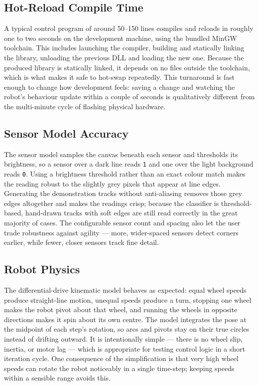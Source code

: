 \subsection{Hot-Reload Compile Time}

A typical control program of around 50--150 lines compiles and reloads in roughly one to two seconds on the development machine, using the bundled MinGW toolchain. This includes launching the compiler, building and statically linking the library, unloading the previous DLL and loading the new one. Because the produced library is statically linked, it depends on no files outside the toolchain, which is what makes it safe to hot-swap repeatedly. This turnaround is fast enough to change how development feels: saving a change and watching the robot's behaviour update within a couple of seconds is qualitatively different from the multi-minute cycle of flashing physical hardware.

\subsection{Sensor Model Accuracy}

The sensor model samples the canvas beneath each sensor and thresholds its brightness, so a sensor over a dark line reads \texttt{1} and one over the light background reads \texttt{0}. Using a brightness threshold rather than an exact colour match makes the reading robust to the slightly grey pixels that appear at line edges. Generating the demonstration tracks without anti-aliasing removes those grey edges altogether and makes the readings crisp; because the classifier is threshold-based, hand-drawn tracks with soft edges are still read correctly in the great majority of cases. The configurable sensor count and spacing also let the user trade robustness against agility --- more, wider-spaced sensors detect corners earlier, while fewer, closer sensors track fine detail.

\subsection{Robot Physics}

The differential-drive kinematic model behaves as expected: equal wheel speeds produce straight-line motion, unequal speeds produce a turn, stopping one wheel makes the robot pivot about that wheel, and running the wheels in opposite directions makes it spin about its own centre. The model integrates the pose at the midpoint of each step's rotation, so arcs and pivots stay on their true circles instead of drifting outward. It is intentionally simple --- there is no wheel slip, inertia, or motor lag --- which is appropriate for testing control logic in a short iteration cycle. One consequence of the simplification is that very high wheel speeds can rotate the robot noticeably in a single time-step; keeping speeds within a sensible range avoids this.

